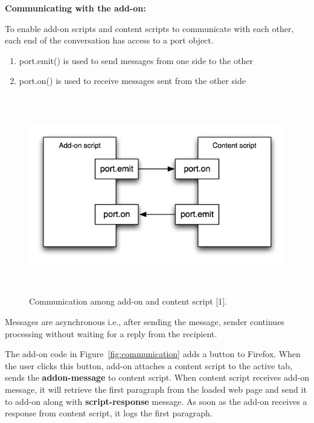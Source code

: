 \textbf{Communicating with the add-on:}

To enable add-on scripts and content scripts to communicate with each other, each end of the conversation has access to a port object.
\begin{enumerate}
\item port.emit() is used to send messages from one side to the other 
\item port.on() is used to receive messages sent from the other side
\end{enumerate}

\begin{figure}
  \centering
      \includegraphics[width=16cm, height=8.65cm]{content-scripting-overview.png}
    \caption[Communication among add-on and content script]{Communication among add-on and content script [1].}
    \label{fig:content-scripting-overview}
\end{figure}

Messages are asynchronous i.e., after sending the message, sender continues processing without waiting for a reply from the recipient.

The add-on code in Figure~\ref{fig:communication} adds a button to Firefox. When the user clicks this button, add-on attaches a content script to the active tab, sends the \textbf{addon-message} to content script. When content script receives add-on message, it will retrieve the first paragraph from the loaded web page and send it to add-on along with \textbf{script-response} message. As soon as the add-on receives a response from content script, it logs the first paragraph.

